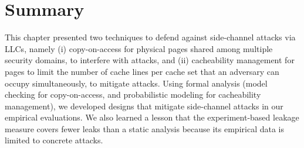 \section{Summary}
This chapter presented two techniques to defend against side-channel
attacks via \glspl{LLC}, namely (i) copy-on-access for physical pages shared
among multiple security domains, to interfere with \flushreload
attacks, and (ii) cacheability management for pages to limit the
number of cache lines per cache set that an adversary can occupy
simultaneously, to mitigate \primeprobe attacks.  Using formal
analysis (model checking for copy-on-access, and probabilistic
modeling for cacheability management), we developed designs that
mitigate side-channel attacks in our empirical evaluations. We also
learned a lesson that the experiment-based leakage measure covers
fewer leaks than a static analysis because its empirical data is
limited to concrete attacks.  
